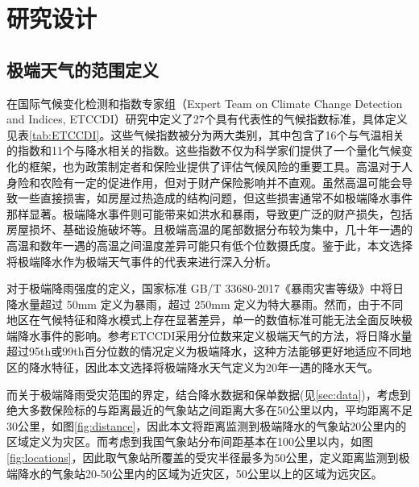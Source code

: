 \chapter{研究设计}
\section{极端天气的范围定义}\label{sec:def}

在国际气候变化检测和指数专家组（Expert Team on Climate Change Detection and Indices, ETCCDI）研究\citep{alexander2006global}中定义了27个具有代表性的气候指数标准，具体定义见表\ref{tab:ETCCDI}。这些气候指数被分为两大类别，其中包含了16个与气温相关的指数和11个与降水相关的指数。这些指数不仅为科学家们提供了一个量化气候变化的框架，也为政策制定者和保险业提供了评估气候风险的重要工具。高温对于人身险\citep{马姝瑞2014}和农险\citep{梁来存2019气温天气指数保险的费率厘定}有一定的促进作用，但对于财产保险影响并不直观。虽然高温可能会导致一些直接损害，如房屋过热造成的结构问题，但这些损害通常不如极端降水事件那样显著。极端降水事件则可能带来如洪水和暴雨，导致更广泛的财产损失，包括房屋损坏、基础设施破坏等。且极端高温的尾部数据分布较为集中\citep{尹红2019基于}，几十年一遇的高温和数年一遇的高温之间温度差异可能只有低个位数摄氏度。鉴于此，本文选择将极端降水作为极端天气事件的代表来进行深入分析。


对于极端降雨强度的定义，国家标准 GB/T 33680-2017《暴雨灾害等级》中将日降水量超过 50mm 定义为暴雨，超过 250mm 定义为特大暴雨。然而，由于不同地区在气候特征和降水模式上存在显著差异，单一的数值标准可能无法全面反映极端降水事件的影响。参考ETCCDI采用分位数来定义极端天气的方法，将日降水量超过95th或99th百分位数的情况定义为极端降水，这种方法能够更好地适应不同地区的降水特征，因此本文选择将极端降水天气定义为20年一遇的降水天气。

而关于极端降雨受灾范围的界定，结合降水数据和保单数据(见\ref{sec:data})，考虑到绝大多数保险标的与距离最近的气象站之间距离大多在50公里以内，平均距离不足30公里，如图\ref{fig:distance}，因此本文将距离监测到极端降水的气象站20公里内的区域定义为灾区。而考虑到我国气象站分布间距基本在100公里以内，如图\ref{fig:locations}，因此取气象站所覆盖的受灾半径最多为50公里，定义距离监测到极端降水的气象站20-50公里内的区域为近灾区，50公里以上的区域为远灾区。

